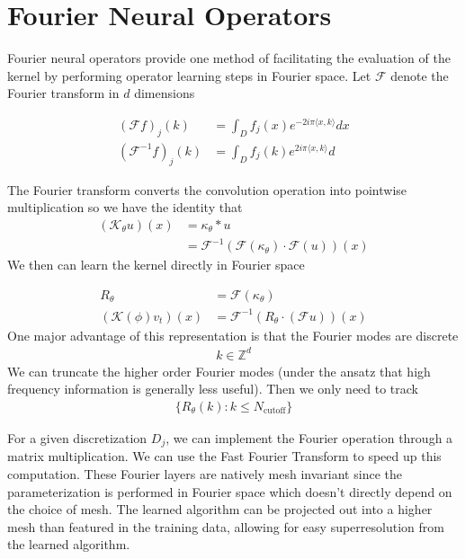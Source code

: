 \documentclass[book.tex]{subfiles}
\begin{document}
\section{Fourier Neural Operators}

Fourier neural operators provide one method of facilitating the evaluation of the kernel by performing operator learning steps in Fourier space. Let $\mathcal{F}$ denote the Fourier transform in $d$ dimensions

\begin{align}
(\mathcal{F} f)_j(k) &= \int_D f_j(x) e^{-2i\pi \langle x, k \rangle} dx \\
(\mathcal{F}^{-1} f)_j(k) &= \int_D f_j(k) e^{2i\pi \langle x, k \rangle} d 
\end{align}

The Fourier transform converts the convolution operation into pointwise multiplication so we have the identity that
\begin{align}
(\mathcal{K}_\theta u)(x) &= \kappa_\theta \ast u \\
&= \mathcal{F}^{-1}\left (\mathcal{F}(\kappa_\theta) \cdot \mathcal{F}(u) \right )(x)
\end{align}
We then can learn the kernel directly in Fourier space

\begin{align}
R_\theta &= \mathcal{F}(\kappa_\theta)\\
(\mathcal{K}(\phi) v_t)(x) &= \mathcal{F}^{-1} \left ( R_\theta \cdot (\mathcal{F} u) \right ) (x)
\end{align}
One major advantage of this representation is that the Fourier modes are discrete
\begin{align}
k \in \mathbb{Z}^d
\end{align}
We can truncate the higher order Fourier modes (under the ansatz that high frequency information is generally less useful). Then we only need to track
\begin{align} 
\{R_\theta(k) : k \leq N_{\textrm{cutoff}} \}
\end{align}

For a given discretization $D_j$, we can implement the Fourier operation through a matrix multiplication. We can use the Fast Fourier Transform to speed up this computation. These Fourier layers are natively mesh invariant since the parameterization is performed in Fourier space which doesn't directly depend on the choice of mesh. The learned algorithm can be projected out into a higher mesh than featured in the training data, allowing for easy superresolution from the learned algorithm.
\end{document}
